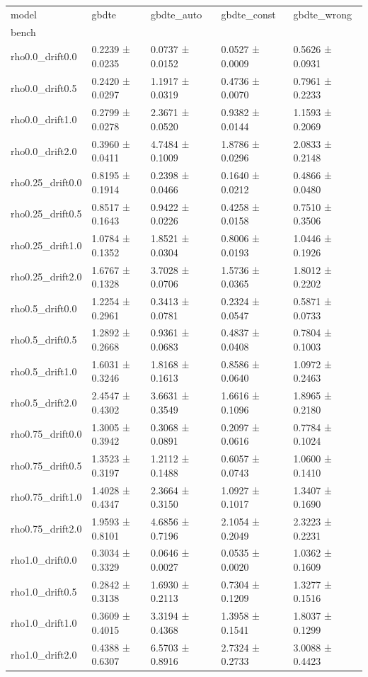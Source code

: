 \begin{tabular}{lllll}
\toprule
model & gbdte & gbdte_auto & gbdte_const & gbdte_wrong \\
bench &  &  &  &  \\
\midrule
rho0.0_drift0.0 & 0.2239 ± 0.0235 & 0.0737 ± 0.0152 & 0.0527 ± 0.0009 & 0.5626 ± 0.0931 \\
rho0.0_drift0.5 & 0.2420 ± 0.0297 & 1.1917 ± 0.0319 & 0.4736 ± 0.0070 & 0.7961 ± 0.2233 \\
rho0.0_drift1.0 & 0.2799 ± 0.0278 & 2.3671 ± 0.0520 & 0.9382 ± 0.0144 & 1.1593 ± 0.2069 \\
rho0.0_drift2.0 & 0.3960 ± 0.0411 & 4.7484 ± 0.1009 & 1.8786 ± 0.0296 & 2.0833 ± 0.2148 \\
rho0.25_drift0.0 & 0.8195 ± 0.1914 & 0.2398 ± 0.0466 & 0.1640 ± 0.0212 & 0.4866 ± 0.0480 \\
rho0.25_drift0.5 & 0.8517 ± 0.1643 & 0.9422 ± 0.0226 & 0.4258 ± 0.0158 & 0.7510 ± 0.3506 \\
rho0.25_drift1.0 & 1.0784 ± 0.1352 & 1.8521 ± 0.0304 & 0.8006 ± 0.0193 & 1.0446 ± 0.1926 \\
rho0.25_drift2.0 & 1.6767 ± 0.1328 & 3.7028 ± 0.0706 & 1.5736 ± 0.0365 & 1.8012 ± 0.2202 \\
rho0.5_drift0.0 & 1.2254 ± 0.2961 & 0.3413 ± 0.0781 & 0.2324 ± 0.0547 & 0.5871 ± 0.0733 \\
rho0.5_drift0.5 & 1.2892 ± 0.2668 & 0.9361 ± 0.0683 & 0.4837 ± 0.0408 & 0.7804 ± 0.1003 \\
rho0.5_drift1.0 & 1.6031 ± 0.3246 & 1.8168 ± 0.1613 & 0.8586 ± 0.0640 & 1.0972 ± 0.2463 \\
rho0.5_drift2.0 & 2.4547 ± 0.4302 & 3.6631 ± 0.3549 & 1.6616 ± 0.1096 & 1.8965 ± 0.2180 \\
rho0.75_drift0.0 & 1.3005 ± 0.3942 & 0.3068 ± 0.0891 & 0.2097 ± 0.0616 & 0.7784 ± 0.1024 \\
rho0.75_drift0.5 & 1.3523 ± 0.3197 & 1.2112 ± 0.1488 & 0.6057 ± 0.0743 & 1.0600 ± 0.1410 \\
rho0.75_drift1.0 & 1.4028 ± 0.4347 & 2.3664 ± 0.3150 & 1.0927 ± 0.1017 & 1.3407 ± 0.1690 \\
rho0.75_drift2.0 & 1.9593 ± 0.8101 & 4.6856 ± 0.7196 & 2.1054 ± 0.2049 & 2.3223 ± 0.2231 \\
rho1.0_drift0.0 & 0.3034 ± 0.3329 & 0.0646 ± 0.0027 & 0.0535 ± 0.0020 & 1.0362 ± 0.1609 \\
rho1.0_drift0.5 & 0.2842 ± 0.3138 & 1.6930 ± 0.2113 & 0.7304 ± 0.1209 & 1.3277 ± 0.1516 \\
rho1.0_drift1.0 & 0.3609 ± 0.4015 & 3.3194 ± 0.4368 & 1.3958 ± 0.1541 & 1.8037 ± 0.1299 \\
rho1.0_drift2.0 & 0.4388 ± 0.6307 & 6.5703 ± 0.8916 & 2.7324 ± 0.2733 & 3.0088 ± 0.4423 \\
\bottomrule
\end{tabular}
